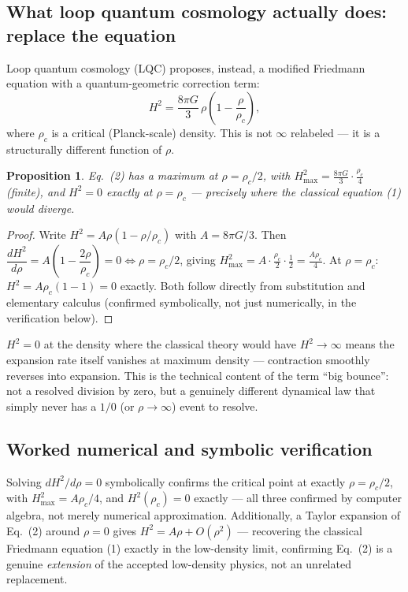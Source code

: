 \documentclass[10pt,journal,compsoc]{IEEEtran}
\newtheorem{proposition}{Proposition}
\begin{document}
\subsection{What loop quantum cosmology actually does: replace the equation}
Loop quantum cosmology (LQC) proposes, instead, a modified Friedmann equation with a quantum-geometric correction term:
\begin{equation}
    H^2 = \frac{8\pi G}{3}\,\rho\left(1-\frac{\rho}{\rho_c}\right),
\end{equation}
where $\rho_c$ is a critical (Planck-scale) density. This is not $\infty$ relabeled — it is a structurally different function of $\rho$.

\begin{proposition}
Eq.~(2) has a maximum at $\rho=\rho_c/2$, with $H^2_{\max} = \frac{8\pi G}{3}\cdot\frac{\rho_c}{4}$ (finite), and $H^2=0$ exactly at $\rho=\rho_c$ — precisely where the classical equation (1) would diverge.
\end{proposition}
\begin{proof}
Write $H^2 = A\rho(1-\rho/\rho_c)$ with $A=8\pi G/3$. Then $\dfrac{dH^2}{d\rho} = A\left(1-\dfrac{2\rho}{\rho_c}\right)=0 \iff \rho=\rho_c/2$, giving $H^2_{\max}=A\cdot\frac{\rho_c}{2}\cdot\frac12 = \frac{A\rho_c}{4}$. At $\rho=\rho_c$: $H^2 = A\rho_c(1-1)=0$ exactly. Both follow directly from substitution and elementary calculus (confirmed symbolically, not just numerically, in the verification below).
\end{proof}
$H^2=0$ at the density where the classical theory would have $H^2\to\infty$ means the expansion rate itself vanishes at maximum density — contraction smoothly reverses into expansion. This is the technical content of the term ``big bounce'': not a resolved division by zero, but a genuinely different dynamical law that simply never has a $1/0$ (or $\rho\to\infty$) event to resolve.

\subsection{Worked numerical and symbolic verification}
Solving $dH^2/d\rho=0$ symbolically confirms the critical point at exactly $\rho=\rho_c/2$, with $H^2_{\max}=A\rho_c/4$, and $H^2(\rho_c)=0$ exactly — all three confirmed by computer algebra, not merely numerical approximation. Additionally, a Taylor expansion of Eq.~(2) around $\rho=0$ gives $H^2 = A\rho + O(\rho^2)$ — recovering the classical Friedmann equation (1) exactly in the low-density limit, confirming Eq.~(2) is a genuine \emph{extension} of the accepted low-density physics, not an unrelated replacement.
\end{document}
